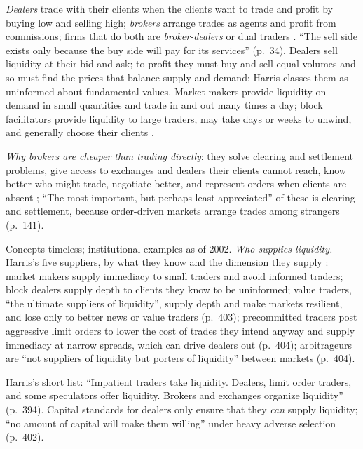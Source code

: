 \begin{qfdefinition}\label{def:market-intermediaries}
 \emph{Dealers} trade with their clients when the clients want to trade and profit by buying low and selling high; \emph{brokers} arrange trades as agents and profit from commissions; firms that do both are \emph{broker-dealers} or dual traders \citep[chap.~3, sec.~3.1.2, pp.~33--34]{alpha-harris}. ``The sell side exists only because the buy side will pay for its services'' (p.~34). Dealers sell liquidity at their bid and ask; to profit they must buy and sell equal volumes and so must find the prices that balance supply and demand; Harris classes them as uninformed about fundamental values. Market makers provide liquidity on demand in small quantities and trade in and out many times a day; block facilitators provide liquidity to large traders, may take days or weeks to unwind, and generally choose their clients \citep[chap.~8, sec.~8.2.2, pp.~195--196]{alpha-harris}.

\emph{Why brokers are cheaper than trading directly}: they solve clearing and settlement problems, give access to exchanges and dealers their clients cannot reach, know better who might trade, negotiate better, and represent orders when clients are absent \citep[chap.~7, sec.~7.1, pp.~140--141]{alpha-harris}; ``The most important, but perhaps least appreciated'' of these is clearing and settlement, because order-driven markets arrange trades among strangers (p.~141).

 Concepts timeless; institutional examples as of 2002. \emph{Who supplies liquidity.} Harris's five suppliers, by what they know and the dimension they supply \citep[chap.~19, secs.~19.3.2--19.3.7, pp.~401--405]{alpha-harris}: market makers supply immediacy to small traders and avoid informed traders; block dealers supply depth to clients they know to be uninformed; value traders, ``the ultimate suppliers of liquidity'', supply depth and make markets resilient, and lose only to better news or value traders (p.~403); precommitted traders post aggressive limit orders to lower the cost of trades they intend anyway and supply immediacy at narrow spreads, which can drive dealers out (p.~404); arbitrageurs are ``not suppliers of liquidity but porters of liquidity'' between markets (p.~404).

Harris's short list: ``Impatient traders take liquidity. Dealers, limit order traders, and some speculators offer liquidity. Brokers and exchanges organize liquidity'' (p.~394). Capital standards for dealers only ensure that they \emph{can} supply liquidity; ``no amount of capital will make them willing'' under heavy adverse selection (p.~402).


\end{qfdefinition}
